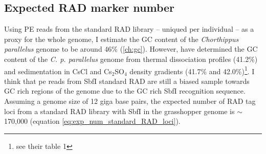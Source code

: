 \documentclass[a4paper,12pt,times,print,index, custombib]{PhDThesisPSnPDF}\usepackage[]{graphicx}\usepackage[]{color}
\begin{document}


\FloatBarrier
\subsection{Expected RAD marker number}\label{ch:RAD_marker_number}

Using PE reads from the standard RAD library -- uniqued  per individual -- as a proxy for the whole genome, I estimate the GC content of the \textit{Chorthippus parallelus} genome to be around 46\% (\ref{ch:gc}). However, \cite{Wilmore1975} have determined the GC content of the \textit{C. p. parallelus} genome from thermal dissociation profiles (41.2\%) and sedimentation in CsCl and Cs$_{2}$SO$_{4}$ density gradients (41.7\% and 42.0\%)\footnote{see their table 1}. I think that \gls{pe} reads from SbfI standard RAD are still a biased sample towards GC rich regions of the genome due to the GC rich \gls{SbfI} recognition sequence. 
Assuming a genome size of 12 giga base pairs, the expected number of RAD tag loci from a standard RAD library with \gls{SbfI} in the grasshopper genome is $\sim$170,000 (equation \ref{eq:exp_num_standard_RAD_loci}). 
\end{document}
